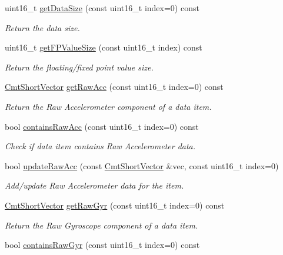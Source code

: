 \begin{DoxyCompactItemize}
\item 
uint16\-\_\-t \hyperlink{classxsens_1_1Packet_a1f8a37d9708c6e7dbf1025a24191dc7e}{get\-Data\-Size} (const uint16\-\_\-t index=0) const 
\begin{DoxyCompactList}\small\item\em \-Return the data size. \end{DoxyCompactList}\item 
uint16\-\_\-t \hyperlink{classxsens_1_1Packet_a8d4f321b81700b51dd9b6b5bd117787a}{get\-F\-P\-Value\-Size} (const uint16\-\_\-t index) const 
\begin{DoxyCompactList}\small\item\em \-Return the floating/fixed point value size. \end{DoxyCompactList}\item 
\hyperlink{structCmtShortVector}{\-Cmt\-Short\-Vector} \hyperlink{classxsens_1_1Packet_a7303682d0d7f1ffc5d312a1297300ead}{get\-Raw\-Acc} (const uint16\-\_\-t index=0) const 
\begin{DoxyCompactList}\small\item\em \-Return the \-Raw \-Accelerometer component of a data item. \end{DoxyCompactList}\item 
\hypertarget{classxsens_1_1Packet_ac181ef90b44f09c1c26552ebc67aafce}{bool \hyperlink{classxsens_1_1Packet_ac181ef90b44f09c1c26552ebc67aafce}{contains\-Raw\-Acc} (const uint16\-\_\-t index=0) const }\label{classxsens_1_1Packet_ac181ef90b44f09c1c26552ebc67aafce}

\begin{DoxyCompactList}\small\item\em \-Check if data item contains \-Raw \-Accelerometer data. \end{DoxyCompactList}\item 
\hypertarget{classxsens_1_1Packet_a7f3dc316fb1450417d4a476eabadf6f3}{bool \hyperlink{classxsens_1_1Packet_a7f3dc316fb1450417d4a476eabadf6f3}{update\-Raw\-Acc} (const \hyperlink{structCmtShortVector}{\-Cmt\-Short\-Vector} \&vec, const uint16\-\_\-t index=0)}\label{classxsens_1_1Packet_a7f3dc316fb1450417d4a476eabadf6f3}

\begin{DoxyCompactList}\small\item\em \-Add/update \-Raw \-Accelerometer data for the item. \end{DoxyCompactList}\item 
\hyperlink{structCmtShortVector}{\-Cmt\-Short\-Vector} \hyperlink{classxsens_1_1Packet_a794ebb55d0b6cd02783fd1d60281acef}{get\-Raw\-Gyr} (const uint16\-\_\-t index=0) const 
\begin{DoxyCompactList}\small\item\em \-Return the \-Raw \-Gyroscope component of a data item. \end{DoxyCompactList}\item 
\hypertarget{classxsens_1_1Packet_a6183cd3b46be747d988d0768e432b969}{bool \hyperlink{classxsens_1_1Packet_a6183cd3b46be747d988d0768e432b969}{contains\-Raw\-Gyr} (const uint16\-\_\-t index=0) const }\label{classxsens_1_1Packet_a6183cd3b46be747d988d0768e432b969}


\end{DoxyCompactItemize}

